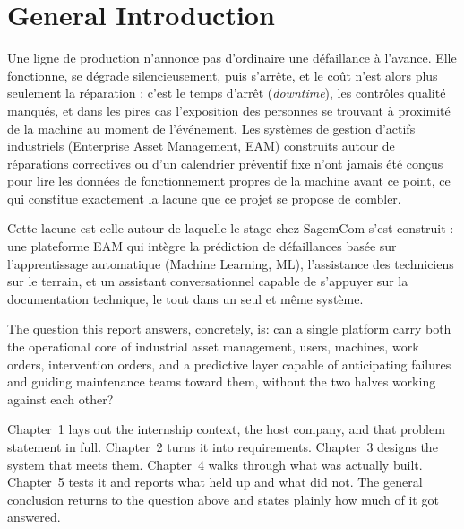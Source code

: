 \chapter*{General Introduction}

Une ligne de production n'annonce pas d'ordinaire une défaillance à l'avance. Elle fonctionne, se dégrade silencieusement, puis s'arrête, et le coût n'est alors plus seulement la réparation : c'est le temps d'arrêt (\textit{downtime}), les contrôles qualité manqués, et dans les pires cas l'exposition des personnes se trouvant à proximité de la machine au moment de l'événement. Les systèmes de gestion d'actifs industriels (Enterprise Asset Management, EAM) construits autour de réparations correctives ou d'un calendrier préventif fixe n'ont jamais été conçus pour lire les données de fonctionnement propres de la machine avant ce point, ce qui constitue exactement la lacune que ce projet se propose de combler.

Cette lacune est celle autour de laquelle le stage chez SagemCom s'est construit : une plateforme EAM qui intègre la prédiction de défaillances basée sur l'apprentissage automatique (Machine Learning, ML), l'assistance des techniciens sur le terrain, et un assistant conversationnel capable de s'appuyer sur la documentation technique, le tout dans un seul et même système.

The question this report answers, concretely, is: can a single platform carry both the operational core of industrial asset management, users, machines, work orders, intervention orders, and a predictive layer capable of anticipating failures and guiding maintenance teams toward them, without the two halves working against each other?

Chapter~1 lays out the internship context, the host company, and that problem statement in full. Chapter~2 turns it into requirements. Chapter~3 designs the system that meets them. Chapter~4 walks through what was actually built. Chapter~5 tests it and reports what held up and what did not. The general conclusion returns to the question above and states plainly how much of it got answered.
